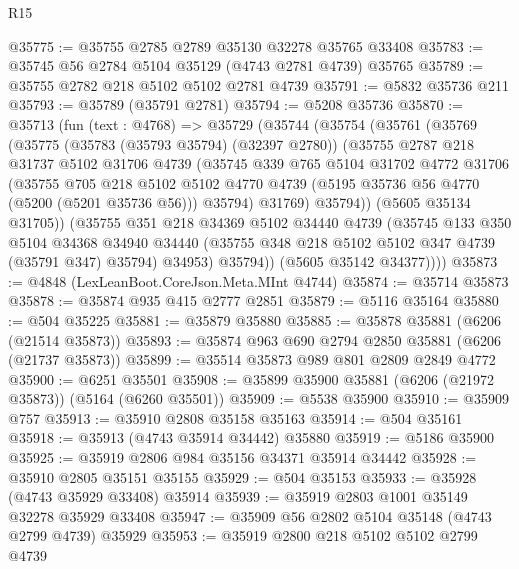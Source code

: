 \begin{lexlean}{R15}
\begin{coremodule}
{{{{{{{{{{{@35775 := @35755 @2785 @2789 @35130 @32278 @35765 @33408
@35783 := @35745 @56 @2784 @5104 @35129 (@4743 @2781 @4739) @35765
@35789 := @35755 @2782 @218 @5102 @5102 @2781 @4739
@35791 := @5832 @35736 @211
@35793 := @35789 (@35791 @2781)
@35794 := @5208 @35736
@35870 := @35713
    (fun (text : @4768) =>
    @35729
      (@35744
        (@35754
          (@35761
            (@35769
              (@35775
                (@35783 (@35793 @35794) (@32397 @2780))
                (@35755
                  @2787
                  @218
                  @31737
                  @5102
                  @31706
                  @4739
                  (@35745
                    @339
                    @765
                    @5104
                    @31702
                    @4772
                    @31706
                    (@35755
                      @705
                      @218
                      @5102
                      @5102
                      @4770
                      @4739
                      (@5195 @35736 @56 @4770 (@5200 (@5201 @35736 @56)))
                      @35794)
                    @31769)
                  @35794))
              (@5605 @35134 @31705))
            (@35755
              @351
              @218
              @34369
              @5102
              @34440
              @4739
              (@35745
                @133
                @350
                @5104
                @34368
                @34940
                @34440
                (@35755 @348 @218 @5102 @5102 @347 @4739 (@35791 @347) @35794)
                @34953)
              @35794))
          (@5605 @35142 @34377))))
@35873 := @4848 (LexLeanBoot.CoreJson.Meta.MInt @4744)
@35874 := @35714 @35873
@35878 := @35874 @935 @415 @2777 @2851
@35879 := @5116 @35164
@35880 := @504 @35225
@35881 := @35879 @35880
@35885 := @35878 @35881 (@6206 (@21514 @35873))
@35893 := @35874 @963 @690 @2794 @2850 @35881 (@6206 (@21737 @35873))
@35899 := @35514 @35873 @989 @801 @2809 @2849 @4772
@35900 := @6251 @35501
@35908 := @35899 @35900 @35881 (@6206 (@21972 @35873)) (@5164 (@6260 @35501))
@35909 := @5538 @35900
@35910 := @35909 @757
@35913 := @35910 @2808 @35158 @35163
@35914 := @504 @35161
@35918 := @35913 (@4743 @35914 @34442) @35880
@35919 := @5186 @35900
@35925 := @35919 @2806 @984 @35156 @34371 @35914 @34442
@35928 := @35910 @2805 @35151 @35155
@35929 := @504 @35153
@35933 := @35928 (@4743 @35929 @33408) @35914
@35939 := @35919 @2803 @1001 @35149 @32278 @35929 @33408
@35947 := @35909 @56 @2802 @5104 @35148 (@4743 @2799 @4739) @35929
@35953 := @35919 @2800 @218 @5102 @5102 @2799 @4739
}}}}}}}}}}}
\end{coremodule}
\end{lexlean}

